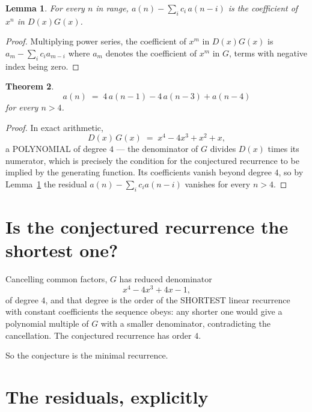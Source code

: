 \documentclass[11pt,a4paper]{article}
\theoremstyle{plain}
\newtheorem{theorem}{Theorem}
\newtheorem{lemma}[theorem]{Lemma}
\theoremstyle{definition}
\begin{document}
\begin{lemma}\label{lem:key}
For every $n$ in range, $a(n)-\sum_i c_i\,a(n-i)$ is the coefficient of $x^{n}$ in
$D(x)G(x)$.
\end{lemma}

\begin{proof}
Multiplying power series, the coefficient of $x^{m}$ in $D(x)G(x)$ is
$a_m-\sum_i c_i a_{m-i}$ where $a_m$ denotes the coefficient of $x^{m}$ in $G$, terms with
negative index being zero.
\end{proof}

\begin{theorem}
\[
a(n)\;=\;4\,a(n-1) - 4\,a(n-3) + a(n-4)
\]
for every $n>4$.
\end{theorem}

\begin{proof}
In exact arithmetic,
\[
D(x)\,G(x)\;=\;x^{4} - 4 x^{3} + x^{2} + x,
\]
a POLYNOMIAL of degree $4$ --- the denominator of $G$ divides $D(x)$ times its numerator,
which is precisely the condition for the conjectured recurrence to be implied by the
generating function. Its coefficients vanish beyond degree $4$, so by
Lemma~\ref{lem:key} the residual $a(n)-\sum_ic_ia(n-i)$ vanishes for every
$n>4$.
\end{proof}

\section{Is the conjectured recurrence the shortest one?}

Cancelling common factors, $G$ has reduced denominator
\[
x^{4} - 4 x^{3} + 4 x - 1,
\]
of degree $4$, and that degree is the order of the SHORTEST linear recurrence with
constant coefficients the sequence obeys: any shorter one would give a polynomial multiple of
$G$ with a smaller denominator, contradicting the cancellation. The conjectured recurrence has
order $4$.

So the conjecture is the minimal recurrence.

\section{The residuals, explicitly}
\end{document}
